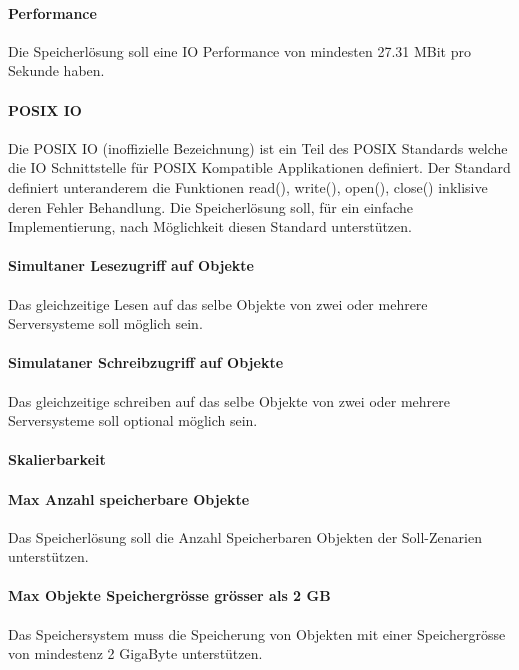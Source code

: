\paragraph{Performance}\label{Soll-3-2}
Die Speicherlösung soll eine IO Performance von mindesten 27.31 MBit pro Sekunde haben.

\paragraph{POSIX IO}\label{Soll-3-3}
Die POSIX IO (inoffizielle Bezeichnung) ist ein Teil des POSIX Standards welche die IO Schnittstelle für POSIX Kompatible Applikationen definiert. Der Standard definiert unteranderem die Funktionen read(), write(), open(), close() inklisive deren Fehler Behandlung. Die Speicherlösung soll, für ein einfache Implementierung, nach Möglichkeit diesen Standard unterstützen. 

\paragraph{Simultaner Lesezugriff auf Objekte}\label{Soll-3-4}
Das gleichzeitige Lesen auf das selbe Objekte von zwei oder mehrere Serversysteme soll möglich sein.

\paragraph{Simulataner Schreibzugriff auf Objekte}\label{Soll-3-5}
Das gleichzeitige schreiben auf das selbe Objekte von zwei oder mehrere Serversysteme soll optional möglich sein.

\setcounter{paragraph}{0}
\renewcommand\theparagraph{Soll-4-\arabic{paragraph}}

\paragraph{Skalierbarkeit}\label{Soll-4-1}

\paragraph{Max Anzahl speicherbare Objekte}\label{Soll-4-2}
Das Speicherlösung soll die Anzahl Speicherbaren Objekten der Soll-Zenarien unterstützen. 

\paragraph{Max Objekte Speichergrösse grösser als 2 GB}\label{Soll-4-3}
Das Speichersystem muss die Speicherung von Objekten mit einer Speichergrösse von mindestenz 2 GigaByte unterstützen.

